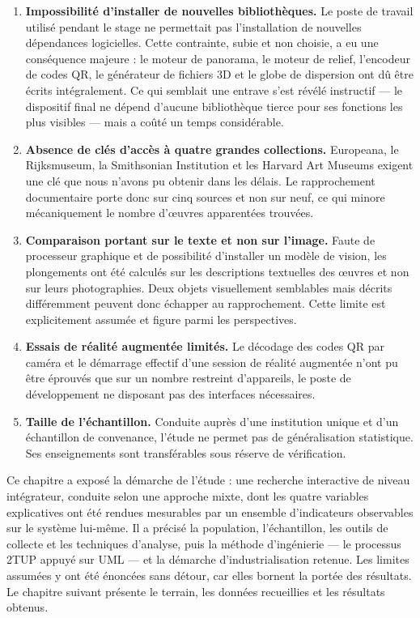 \begin{enumerate}
  \item \textbf{Impossibilité d'installer de nouvelles bibliothèques.} Le poste
        de travail utilisé pendant le stage ne permettait pas l'installation de
        nouvelles dépendances logicielles. Cette contrainte, subie et non
        choisie, a eu une conséquence majeure : le moteur de panorama, le moteur
        de relief, l'encodeur de codes QR, le générateur de fichiers 3D et le
        globe de dispersion ont dû être écrits intégralement. Ce qui semblait
        une entrave s'est révélé instructif — le dispositif final ne dépend
        d'aucune bibliothèque tierce pour ses fonctions les plus visibles — mais
        a coûté un temps considérable.

  \item \textbf{Absence de clés d'accès à quatre grandes collections.} Europeana,
        le Rijksmuseum, la Smithsonian Institution et les Harvard Art Museums
        exigent une clé que nous n'avons pu obtenir dans les délais. Le
        rapprochement documentaire porte donc sur cinq sources et non sur neuf,
        ce qui minore mécaniquement le nombre d'œuvres apparentées trouvées.

  \item \textbf{Comparaison portant sur le texte et non sur l'image.} Faute de
        processeur graphique et de possibilité d'installer un modèle de vision,
        les plongements ont été calculés sur les descriptions textuelles des
        œuvres et non sur leurs photographies. Deux objets visuellement
        semblables mais décrits différemment peuvent donc échapper au
        rapprochement. Cette limite est explicitement assumée et figure parmi
        les perspectives.

  \item \textbf{Essais de réalité augmentée limités.} Le décodage des codes QR
        par caméra et le démarrage effectif d'une session de réalité augmentée
        n'ont pu être éprouvés que sur un nombre restreint d'appareils, le poste
        de développement ne disposant pas des interfaces nécessaires.

  \item \textbf{Taille de l'échantillon.} Conduite auprès d'une institution
        unique et d'un échantillon de convenance, l'étude ne permet pas de
        généralisation statistique. Ses enseignements sont transférables sous
        réserve de vérification.
\end{enumerate}

\conclchap

Ce chapitre a exposé la démarche de l'étude : une recherche interactive de
niveau intégrateur, conduite selon une approche mixte, dont les quatre variables
explicatives ont été rendues mesurables par un ensemble d'indicateurs
observables sur le système lui-même. Il a précisé la population, l'échantillon,
les outils de collecte et les techniques d'analyse, puis la méthode
d'ingénierie — le processus 2TUP appuyé sur UML — et la démarche
d'industrialisation retenue. Les limites assumées y ont été énoncées sans
détour, car elles bornent la portée des résultats. Le chapitre suivant présente
le terrain, les données recueillies et les résultats obtenus.
